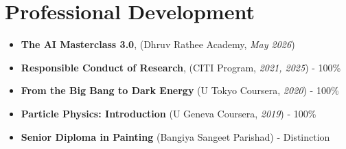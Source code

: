 \documentclass[10pt]{report}
\begin{document}
\section*{Professional Development}
\begin{itemize}
    \item \textbf{The AI Masterclass 3.0}, (Dhruv Rathee Academy, \textit{May 2026})  
    \item \textbf{Responsible Conduct of Research}, (CITI Program, \textit{2021, 2025}) - 100\%
    \item \textbf{From the Big Bang to Dark Energy} (U Tokyo Coursera, \textit{2020}) - 100\%
    \item \textbf{Particle Physics: Introduction} (U Geneva Coursera, \textit{2019}) - 100\%
    \item \textbf{Senior Diploma in Painting} (Bangiya Sangeet Parishad) - Distinction
\end{itemize}

\newpage


\end{document}

